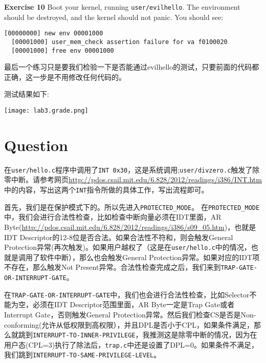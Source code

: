 \documentclass[11pt]{article}
\begin{document}
\begin{framed}
\noindent\textbf{Exercise 10}
  Boot your kernel, running \lstinline|user/evilhello|. The environment should be destroyed, and the kernel should not panic. You should see:

\begin{lstlisting}[aboveskip=-1.5em,frame=none]
  [00000000] new env 00001000
  [00001000] user_mem_check assertion failure for va f0100020
  [00001000] free env 00001000
\end{lstlisting}
\end{framed}
最后一个练习只是要我们检验一下是否能通过evilhello的测试，只要前面的代码都正确，这一步是不用修改任何代码的。

测试结果如下:

\begin{center}
\texttt{[image: lab3.grade.png]}
\end{center}

\section{Question}
\begin{framed}
在\lstinline|user/hello.c|程序中调用了\lstinline|INT 0x30|，这是系统调用;\lstinline|user/divzero.c|触发了除零中断。请参考网页\url{http://pdos.csail.mit.edu/6.828/2012/readings/i386/INT.htm}中的内容，写出这两个\lstinline|INT|指令所做的具体工作，写出流程即可。
\end{framed}

首先，我们是在保护模式下的。所以先进入\lstinline|PROTECTED_MODE|。
在\lstinline|PROTECTED_MODE|中，我们会进行合法性检查，比如检查中断向量必须在IDT里面，AR Byte(\url{http://pdos.csail.mit.edu/6.828/2012/readings/i386/s09_05.htm})，也就是IDT Descriptor的12-8位是否合法。如果合法性不符和，则会触发General Protection异常(再次触发)。如果用户越权了（这是在\lstinline|user/hello.c|中的情况，也就是调用了软件中断），那么也会触发General Protection异常。如果对应的IDT项不存在，那么触发Not Present异常。合法性检查完成之后，我们来到\lstinline|TRAP-GATE-OR-INTERRUPT-GATE|。

在\lstinline|TRAP-GATE-OR-INTERRUPT-GATE|中，我们也会进行合法性检查，比如Selector不能为空，必须在IDT Descriptor范围里面，AR Byte一定是Trap Gate或者Interrupt Gate，否则触发General Protection异常。然后我们检查CS是否是Non-conforming(允许从低权限到高权限），并且DPL是否小于CPL，如果条件满足，那么就跳到\lstinline|INTERRUPT-TO-INNER-PRIVILEGE|，我推测这是除零中断的情况，因为在用户态(CPL=3)执行了除法后，\lstinline|trap.c|中还是设置了DPL=0。如果条件不满足，我们跳到\lstinline|INTERRUPT-TO-SAME-PRIVILEGE-LEVEL|。
\end{document}
